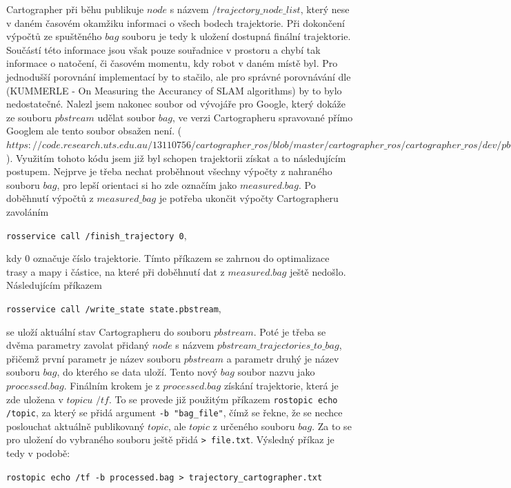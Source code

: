 \documentclass[12pt]{article}
\begin{document}
Cartographer při běhu publikuje $node$ s názvem $/trajectory\_node\_list$, který nese v daném časovém okamžiku informaci o všech bodech trajektorie. Při dokončení výpočtů ze spuštěného $bag$ souboru je tedy k uložení dostupná finální trajektorie. Součástí této informace jsou však pouze souřadnice v prostoru a chybí tak informace o natočení, či časovém momentu, kdy robot v daném místě byl. Pro jednodušší porovnání implementací by to stačilo, ale pro správné porovnávání dle (KUMMERLE - On Measuring the Accurancy of SLAM algorithms) by to bylo nedostatečné. Nalezl jsem nakonec soubor od vývojáře pro Google, který dokáže ze souboru $pbstream$ udělat soubor $bag$, ve verzi Cartographeru spravované přímo Googlem ale tento soubor obsažen není. ($https://code.research.uts.edu.au/13110756/cartographer\_ros/blob/master/cartographer\_ros/cartographer\_ros/dev/pbstream\_trajectories\_to\_rosbag\_main.cc$). Využitím tohoto kódu jsem již byl schopen trajektorii získat a to následujícím postupem. Nejprve je třeba nechat proběhnout všechny výpočty z nahraného souboru $bag$, pro lepší orientaci si ho zde označím jako $measured.bag$. Po doběhnutí výpočtů z $measured\_bag$ je potřeba ukončit výpočty Cartographeru zavoláním
\begin{center}
	\texttt{rosservice call /finish\_trajectory 0},
\end{center}
kdy $0$ označuje číslo trajektorie. Tímto příkazem se zahrnou do optimalizace trasy a mapy i částice, na které při doběhnutí dat z $measured.bag$ ještě nedošlo. Následujícím příkazem
\begin{center}
	\texttt{rosservice call /write\_state state.pbstream},
\end{center} 
se uloží aktuální stav Cartographeru do souboru $pbstream$. Poté je třeba se dvěma parametry zavolat přidaný $node$ s názvem $pbstream\_trajectories\_to\_bag$, přičemž první parametr je název souboru $pbstream$ a parametr druhý je název souboru $bag$, do kterého se data uloží. Tento nový $bag$ soubor nazvu jako $processed.bag$. Finálním krokem je z $processed.bag$ získání trajektorie, která je zde uložena v $topicu$ $/tf$. To se provede již použitým příkazem \texttt{rostopic echo /topic}, za který se přidá argument \texttt{-b "bag\_file"}, čímž se řekne, že se nechce poslouchat aktuálně publikovaný $topic$, ale $topic$ z určeného souboru $bag$. Za to se pro uložení do vybraného souboru ještě přidá \texttt{> file.txt}. Výsledný příkaz je tedy v podobě:
\begin{center}
	\texttt{rostopic echo /tf -b processed.bag > trajectory\_cartographer.txt}
\end{center}
\end{document}
